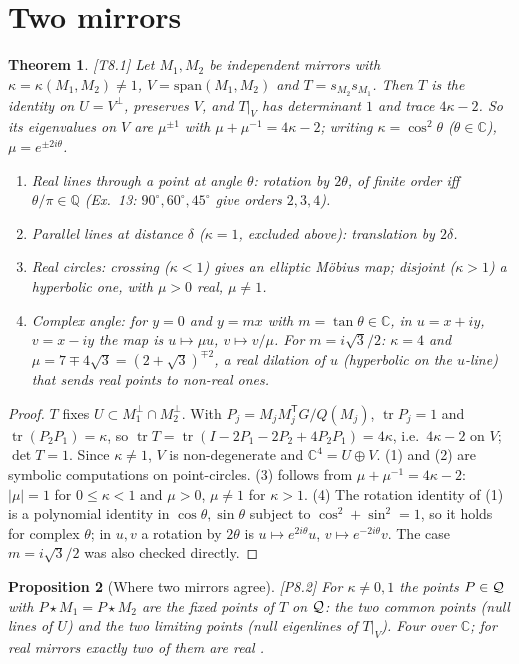 \documentclass[11pt]{article}
\newtheorem{theorem}{Theorem}[section]\newtheorem{proposition}[theorem]{Proposition}
\theoremstyle{definition}\newtheorem{definition}[theorem]{Definition}\newtheorem{remark}[theorem]{Remark}\newtheorem{example}[theorem]{Example}
\newcommand{\C}{\mathbb{C}}\newcommand{\R}{\mathbb{R}}\newcommand{\PP}{\mathbb{P}}
\newcommand{\chk}[1]{\hfill{\footnotesize\textsf{[#1]}}}
\begin{document}
\section{Two mirrors}\label{sec:two}
\begin{theorem}\label{thm:two}\chk{T8.1}
Let $M_1,M_2$ be independent mirrors with $\kappa=\kappa(M_1,M_2)\ne1$, $V=\mathrm{span}(M_1,M_2)$ and $T=s_{M_2}s_{M_1}$. Then $T$ is the identity on $U=V^\perp$, preserves $V$, and $T|_V$ has determinant $1$ and trace $4\kappa-2$. So its eigenvalues on $V$ are $\mu^{\pm1}$ with $\mu+\mu^{-1}=4\kappa-2$; writing $\kappa=\cos^2\theta$ ($\theta\in\C$), $\mu=e^{\pm2i\theta}$.
\begin{enumerate}
\item Real lines through a point at angle $\theta$: rotation by $2\theta$, of finite order iff $\theta/\pi\in\mathbb Q$ (Ex.~13: $90^\circ,60^\circ,45^\circ$ give orders $2,3,4$).
\item Parallel lines at distance $\delta$ ($\kappa=1$, excluded above): translation by $2\delta$.
\item Real circles: crossing ($\kappa<1$) gives an elliptic Möbius map; disjoint ($\kappa>1$) a hyperbolic one, with $\mu>0$ real, $\mu\ne1$.
\item Complex angle: for $y=0$ and $y=mx$ with $m=\tan\theta\in\C$, in $u=x+iy$, $v=x-iy$ the map is $u\mapsto\mu u$, $v\mapsto v/\mu$. For $m=i\sqrt3/2$: $\kappa=4$ and $\mu=7\mp4\sqrt3=(2+\sqrt3)^{\mp2}$, a real dilation of $u$ (hyperbolic on the $u$-line) that sends real points to non-real ones.
\end{enumerate}
\end{theorem}
\begin{proof}
$T$ fixes $U\subset M_1^\perp\cap M_2^\perp$. With $P_j=M_jM_j^{\mathsf T}G/Q(M_j)$, $\operatorname{tr}P_j=1$ and $\operatorname{tr}(P_2P_1)=\kappa$, so $\operatorname{tr}T=\operatorname{tr}(I-2P_1-2P_2+4P_2P_1)=4\kappa$, i.e.\ $4\kappa-2$ on $V$; $\det T=1$. Since $\kappa\ne1$, $V$ is non-degenerate and $\C^4=U\oplus V$. (1) and (2) are symbolic computations on point-circles. (3) follows from $\mu+\mu^{-1}=4\kappa-2$: $|\mu|=1$ for $0\le\kappa<1$ and $\mu>0$, $\mu\neq1$ for $\kappa>1$. (4) The rotation identity of (1) is a polynomial identity in $\cos\theta,\sin\theta$ subject to $\cos^2+\sin^2=1$, so it holds for complex $\theta$; in $u,v$ a rotation by $2\theta$ is $u\mapsto e^{2i\theta}u$, $v\mapsto e^{-2i\theta}v$. The case $m=i\sqrt3/2$ was also checked directly.
\end{proof}
\begin{proposition}[Where two mirrors agree]\label{prop:agree}\chk{P8.2}
For $\kappa\ne0,1$ the points $P\in\mathcal{Q}$ with $P\star M_1=P\star M_2$ are the fixed points of $T$ on $\mathcal{Q}$: the two common points (null lines of $U$) and the two limiting points (null eigenlines of $T|_V$). Four over $\C$; for real mirrors exactly two of them are real \cite[Thm.~5]{alt}.
\end{proposition}
\end{document}

